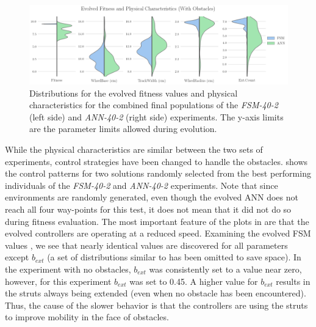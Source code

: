 \begin{figure}[!ht]
    \centering

    \includegraphics[width=\columnwidth]{figures/4-results/40-2-best_params.png}

    \vspace{-0.07in}

    \caption{Distributions for the evolved fitness values and physical characteristics for the combined final populations of the \emph{FSM-40-2} (left side) and \emph{ANN-40-2} (right side) experiments. The y-axis limits are the parameter limits allowed during evolution.}
    \label{fig:40-2-best-params}

    \vspace{-0.2in}

\end{figure}



While the physical characteristics are similar between the two sets of experiments, control strategies have been changed to handle the obstacles.
%
 shows the control patterns for two solutions randomly selected from the best performing individuals of the \emph{FSM-40-2} and \emph{ANN-40-2} experiments.
%
Note that since environments are randomly generated, even though the evolved ANN does not reach all four way-points for this test, it does not mean that it did not do so during fitness evaluation.
%
The most important feature of the plots in  are that the evolved controllers are operating at a reduced speed.
%
%
Examining the evolved FSM values , we see that nearly identical values are discovered for all parameters except $b_{\mathit{ext}}$
(a set of distributions similar to  has been omitted to save space).
%
In the experiment with no obstacles, $b_{\mathit{ext}}$ was consistently set to a value near zero, however, for this experiment $b_{\mathit{ext}}$ was set to 0.45.
%
A higher value for $b_{\mathit{ext}}$ results in the struts always being extended (even when no obstacle has been encountered).
%
Thus, the cause of the slower behavior is that the controllers are using the struts to improve mobility in the face of obstacles.
%




